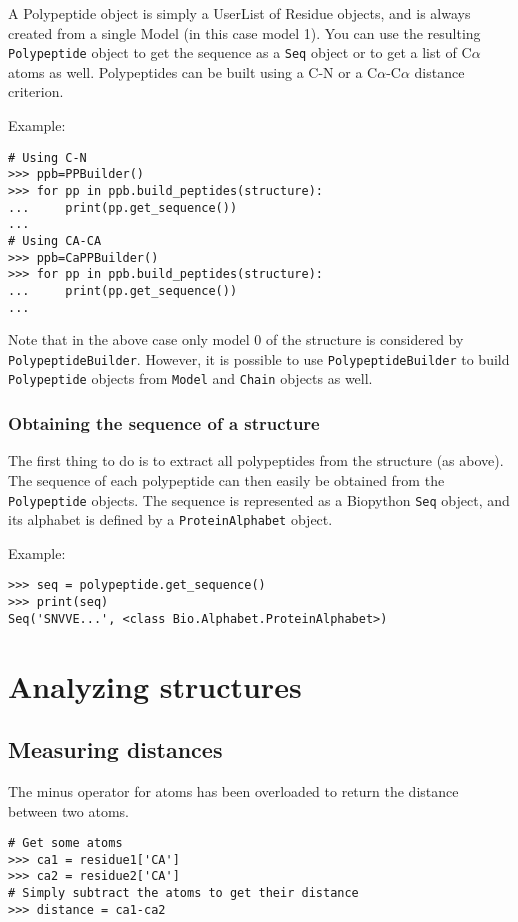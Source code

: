 A Polypeptide object is simply a UserList of Residue objects, and is always created from a single Model (in this case model 1).
You can use the resulting \texttt{Polypeptide} object to get the sequence as a \texttt{Seq} object or to get a list of C$\alpha$ atoms as well. Polypeptides can be built using a C-N or a C$\alpha$-C$\alpha$ distance criterion.

Example:

\begin{verbatim}
# Using C-N
>>> ppb=PPBuilder()
>>> for pp in ppb.build_peptides(structure):
...     print(pp.get_sequence())
...
# Using CA-CA
>>> ppb=CaPPBuilder()
>>> for pp in ppb.build_peptides(structure):
...     print(pp.get_sequence())
...
\end{verbatim}
Note that in the above case only model 0 of the structure is considered
by \texttt{PolypeptideBuilder}. However, it is possible to use \texttt{PolypeptideBuilder}
to build \texttt{Polypeptide} objects from \texttt{Model} and \texttt{Chain}
objects as well.

\subsubsection*{Obtaining the sequence of a structure}

The first thing to do is to extract all polypeptides from the structure
(as above). The sequence of each polypeptide can then easily
be obtained from the \texttt{Polypeptide} objects. The sequence is
represented as a Biopython \texttt{Seq} object, and its alphabet is
defined by a \texttt{ProteinAlphabet} object.

Example:

\begin{verbatim}
>>> seq = polypeptide.get_sequence()
>>> print(seq)
Seq('SNVVE...', <class Bio.Alphabet.ProteinAlphabet>)
\end{verbatim}

\section{Analyzing structures}

\subsection{Measuring distances}
The minus operator for atoms has been overloaded to return the distance between two atoms.
\begin{verbatim}
# Get some atoms
>>> ca1 = residue1['CA']
>>> ca2 = residue2['CA']
# Simply subtract the atoms to get their distance
>>> distance = ca1-ca2
\end{verbatim}

